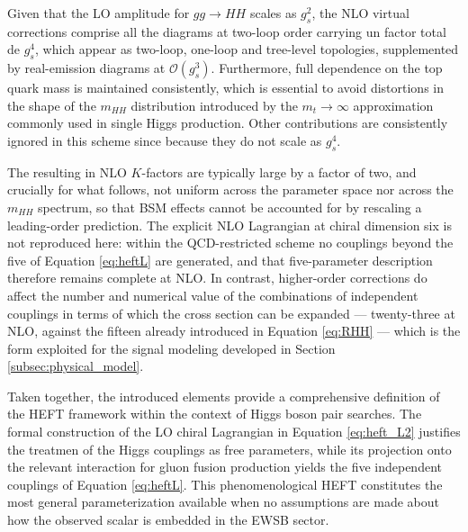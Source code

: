 Given that the LO amplitude for $gg\to HH$ scales as $g_s^2$, the NLO virtual corrections comprise all the diagrams at two-loop order carrying un factor total de $g_s^4$, which appear as two-loop, one-loop and tree-level topologies, supplemented by real-emission diagrams at $\mathcal{O}(g_s^3)$. Furthermore, full dependence on the top quark mass is maintained consistently, which is essential to avoid distortions in the shape of the $m_{HH}$ distribution introduced by the $m_t\rightarrow\infty$ approximation commonly used in single Higgs production. Other contributions are consistently ignored in this scheme since because they do not scale as $g_s^4$.

The resulting in NLO $K$-factors are typically large by a factor of two, and crucially for what follows, not uniform across the parameter space nor across the $m_{HH}$ spectrum, so that BSM effects cannot be accounted for by rescaling a leading-order prediction. The explicit NLO Lagrangian at chiral dimension six is not reproduced here: within the QCD-restricted scheme no couplings beyond the five of Equation \ref{eq:heftL} are generated, and that five-parameter description therefore remains complete at NLO. In contrast, higher-order corrections do affect the number and numerical value of the combinations of independent couplings in terms of which the cross section can be expanded — twenty-three at NLO, against the fifteen already introduced in
Equation \ref{eq:RHH} — which is the form exploited for the signal modeling developed in
Section \ref{subsec:physical_model}.

\vspace{10pt}

\noindent Taken together, the introduced elements provide a comprehensive definition of the HEFT framework within the context of Higgs boson pair searches. The formal construction of the LO chiral Lagrangian in Equation \ref{eq:heft_L2} justifies the treatmen of the Higgs couplings as free parameters, while its projection onto the relevant interaction for gluon fusion production yields the five independent couplings of Equation \ref{eq:heftL}. This phenomenological HEFT constitutes the most general parameterization available when no assumptions are made about how the observed scalar is embedded in the EWSB sector.




